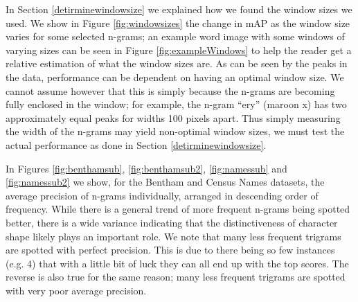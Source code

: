 \documentclass[ms,electronic,twosidetoc,letterpaper,chaptercenter,parttop,lof,lot]{byumsphd}
\begin{document}
In Section \ref{detirminewindowsize} we explained how we found the window sizes we used. We show in Figure \ref{fig:windowsizes} the change in mAP as the window size varies for some selected n-grams; an example word image with some windows of varying sizes can be seen in Figure \ref{fig:exampleWindows} to help the reader get a relative estimation of what the window sizes are. As can be seen by the peaks in the data, performance can be dependent on having an optimal window size. We cannot assume however that this is simply because the n-grams are becoming fully enclosed in the window; for example, the n-gram ``ery'' (maroon x) has two approximately equal peaks for widths 100 pixels apart. Thus simply measuring the width of the n-grams may yield non-optimal window sizes, we must test the actual performance as done in Section \ref{detirminewindowsize}.



In Figures \ref{fig:benthamsub}, \ref{fig:benthamsub2}, \ref{fig:namessub} and \ref{fig:namessub2} we show, for the Bentham and Census Names datasets, the average precision of n-grams individually, arranged in descending order of frequency. While there is a general trend of more frequent n-grams being spotted better, there is a wide variance indicating that the distinctiveness of character shape likely plays an important role. We note that many less frequent trigrams are spotted with perfect precision. This is due to there being so few instances (e.g. 4) that with a little bit of luck they can all end up with the top scores. The reverse is also true for the same reason; many less frequent trigrams are spotted with very poor average precision.
\end{document}
